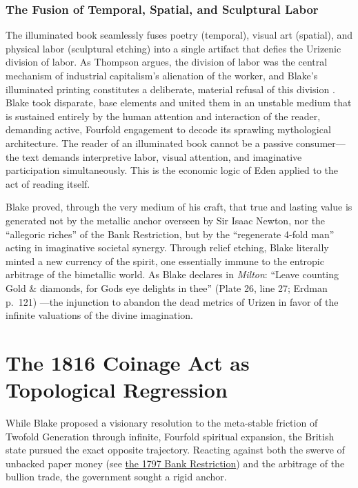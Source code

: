 \documentclass[
]{article}
\begin{document}
\subsubsection{The Fusion of Temporal, Spatial, and Sculptural
Labor}\label{the-fusion-of-temporal-spatial-and-sculptural-labor}

The illuminated book seamlessly fuses poetry (temporal), visual art
(spatial), and physical labor (sculptural etching) into a single
artifact that defies the Urizenic division of labor. As Thompson argues,
the division of labor was the central mechanism of industrial
capitalism's alienation of the worker, and Blake's illuminated printing
constitutes a deliberate, material refusal of this division
\citep{thompson1993witness}. Blake took disparate, base elements and
united them in an unstable medium that is sustained entirely by the
human attention and interaction of the reader, demanding active,
Fourfold engagement to decode its sprawling mythological architecture.
The reader of an illuminated book cannot be a passive consumer---the
text demands interpretive labor, visual attention, and imaginative
participation simultaneously. This is the economic logic of Eden applied
to the act of reading itself.

Blake proved, through the very medium of his craft, that true and
lasting value is generated not by the metallic anchor overseen by Sir
Isaac Newton, nor the ``allegoric riches'' of the Bank Restriction, but
by the ``regenerate 4-fold man'' acting in imaginative societal synergy.
Through relief etching, Blake literally minted a new currency of the
spirit, one essentially immune to the entropic arbitrage of the
bimetallic world. As Blake declares in \emph{Milton}: ``Leave counting
Gold \& diamonds, for Gods eye delights in thee'' (Plate 26, line 27;
Erdman p.~121) \citep{erdman1988complete}---the injunction to abandon
the dead metrics of Urizen in favor of the infinite valuations of the
divine imagination.

\newpage

\section{The 1816 Coinage Act as Topological
Regression}\label{the-1816-coinage-act-as-topological-regression}

While Blake proposed a visionary resolution to the meta-stable friction
of Twofold Generation through infinite, Fourfold spiritual expansion,
the British state pursued the exact opposite trajectory. Reacting
against both the swerve of unbacked paper money (see
\href{02c_bank_restriction_1797.md\#the-1797-bank-restriction-and-the-suspension-of-metallic-reality}{the
1797 Bank Restriction}) and the arbitrage of the bullion trade, the
government sought a rigid anchor.
\end{document}
